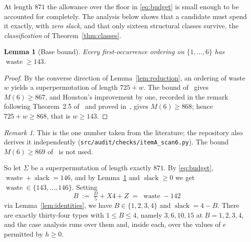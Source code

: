 \documentclass[10pt]{article}
\newtheorem{lemma}[theorem]{Lemma}
\theoremstyle{remark}
\newtheorem{remark}[theorem]{Remark}
\theoremstyle{plain}
\newcommand{\slack}{\operatorname{slack}}
\newcommand{\waste}{\operatorname{waste}}
\newcommand{\prog}[1]{\texttt{#1}}
\begin{document}
At length $871$ the allowance over the floor in \eqref{eq:budget} is
small enough to be accounted for completely.  The analysis below shows
that a candidate must spend it exactly, with \emph{zero slack}, and
that only sixteen structural classes survive, the \emph{classification}
of Theorem~\ref{thm:classes}.

\begin{lemma}[Base bound]\label{lem:base}
Every first-occurrence ordering on $\{1,\dots,6\}$ has
$\waste\ge 143$.
\end{lemma}

\begin{proof}
By the converse direction of Lemma~\ref{lem:reduction}, an ordering of
waste $w$ yields a superpermutation of length $725+w$.  The
bound of~\cite{HPV18} gives $M(6)\ge 867$, and Houston's improvement by
one, recorded in the remark following Theorem~2.5 of~\cite{EV21} and
proved in~\cite{R26}, gives $M(6)\ge 868$; hence $725+w\ge 868$, that
is $w\ge 143$.
\end{proof}

\begin{remark}
This is the one number taken from the literature; the repository also
derives it independently
(\prog{src/\allowbreak audit/\allowbreak checks/\allowbreak itemA\_scan6.py}).
The bound $M(6)\ge 869$ of~\cite{HR26} is not used.
\end{remark}

So let $\Sigma$ be a superpermutation of length exactly $871$.  By
\eqref{eq:budget}, $\waste+\slack=146$, and by Lemma~\ref{lem:base} and
$\slack\ge 0$ we get $\waste\in\{143,\dots,146\}$.  Setting
\[
  B \;:=\; \tfrac{D}{5}+X4+Z \;=\; \waste-142
\]
via Lemma~\ref{lem:identities}, we have $B\in\{1,2,3,4\}$ and
$\slack=4-B$.  There are exactly thirty-four types with $1\le B\le 4$,
namely $3,6,10,15$ at $B=1,2,3,4$, and the case analysis runs over them
and, inside each, over the values of $e$ permitted by $h\ge 0$.
\end{document}
